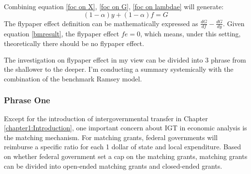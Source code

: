 Combining equation \ref{foc on X}, \ref{foc on G}, \ref{foc on lambdae} will generate:
\begin{equation}
    (1-\alpha)y+(1-\alpha)f=G \label{bmresult}
\end{equation}
The flypaper effect definition can be mathematically expressed as $\frac{d G}{d f}-\frac{d G}{d y}$. Given equation \ref{bmresult}, the flypaper effect $fe=0$, which means, under this setting, theoretically there should be no flypaper effect.

The investigation on flypaper effect in my view can be divided into 3 phrase from the shallower to the deeper. I'm conducting a summary systemically with the combination of the benchmark Ramsey model.

\subsubsection{Phrase One}
Except for the introduction of intergovernmental transfer in Chapter \ref*{chapter1:Introduction}, one important concern about IGT in economic analysis is the matching mechanism. For matching grants, federal governments will reimburse a specific ratio for each 1 dollar of state and local expenditure. Based on whether federal government set a cap on the matching grants, matching grants can be divided into open-ended matching grants and closed-ended grants.


